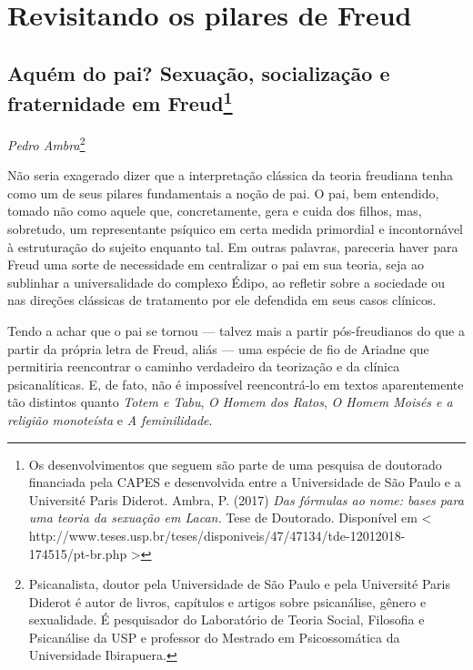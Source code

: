 \part{Revisitando os pilares de Freud}


\chapter*{Aquém do pai? Sexuação, socialização e fraternidade em
  Freud\footnote{Os desenvolvimentos que seguem são parte de uma
    pesquisa de doutorado financiada pela CAPES e desenvolvida entre a
    Universidade de São Paulo e a Université Paris Diderot. Ambra, P.
    (2017) \emph{Das fórmulas ao nome: bases para uma teoria da sexuação
    em Lacan.} Tese de Doutorado. Disponível em \textless{}
    http://www.teses.usp.br/teses/disponiveis/47/47134/tde-12012018-174515/pt-br.php
    \textgreater{}}}

\begin{flushright}
\emph{Pedro Ambra}\footnote{Psicanalista, doutor pela Universidade de São Paulo
  e pela Université Paris Diderot é autor de livros, capítulos e artigos
  sobre psicanálise, gênero e sexualidade. É pesquisador do Laboratório
  de Teoria Social, Filosofia e Psicanálise da USP e professor do
  Mestrado em Psicossomática da Universidade Ibirapuera.}
\end{flushright}

Não seria exagerado dizer que a interpretação clássica da teoria
freudiana tenha como um de seus pilares fundamentais a noção de pai. O
pai, bem entendido, tomado não como aquele que, concretamente, gera e
cuida dos filhos, mas, sobretudo, um representante psíquico em certa
medida primordial e incontornável à estruturação do sujeito enquanto
tal. Em outras palavras, pareceria haver para Freud uma sorte de
necessidade em centralizar o pai em sua teoria, seja ao sublinhar a
universalidade do complexo Édipo, ao refletir sobre a sociedade ou nas
direções clássicas de tratamento por ele defendida em seus casos
clínicos.

Tendo a achar que o pai se tornou --- talvez mais a partir
pós-freudianos do que a partir da própria letra de Freud, aliás --- uma
espécie de fio de Ariadne que permitiria reencontrar o caminho
verdadeiro da teorização e da clínica psicanalíticas. E, de fato, não é
impossível reencontrá-lo em textos aparentemente tão distintos quanto
\emph{Totem e Tabu}, \emph{O Homem dos Ratos}, \emph{O Homem Moisés e a
religião monoteísta} e \emph{A feminilidade}.

